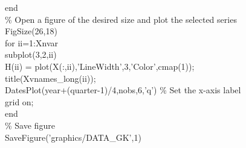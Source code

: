 \hspace{1mm}\hspace{5mm} \textcolor{matlabblue}{end} \\ 
\hspace{1mm}\hspace{5mm} \textcolor{matlabgreen}{\% Open a figure of the desired size and plot the selected series }\\ 
\hspace{1mm}\hspace{5mm} FigSize(26,18) \\ 
\hspace{1mm}\hspace{5mm} \textcolor{matlabblue}{for} ii=1:Xnvar \\ 
\hspace{1mm}\hspace{5mm} \hspace{5mm} subplot(3,2,ii) \\ 
\hspace{1mm}\hspace{5mm} \hspace{5mm} H(ii) = plot(X(:,ii),\textcolor{matlabpurple}{'LineWidth'},3,\textcolor{matlabpurple}{'Color'},cmap(1)); \\ 
\hspace{1mm}\hspace{5mm} \hspace{5mm} title(Xvnames\_long(ii));  \\ 
\hspace{1mm}\hspace{5mm} \hspace{5mm} DatesPlot(year+(quarter-1)/4,nobs,6,\textcolor{matlabpurple}{'q'}) \textcolor{matlabgreen}{\% Set the x-axis label  }\\ 
\hspace{1mm}\hspace{5mm} \hspace{5mm} grid on;  \\ 
\hspace{1mm}\hspace{5mm} \textcolor{matlabblue}{end} \\ 
\hspace{1mm}\hspace{5mm} \textcolor{matlabgreen}{\% Save figure }\\ 
\hspace{1mm}\hspace{5mm} SaveFigure(\textcolor{matlabpurple}{'graphics/DATA\_GK'},1) \\ 
